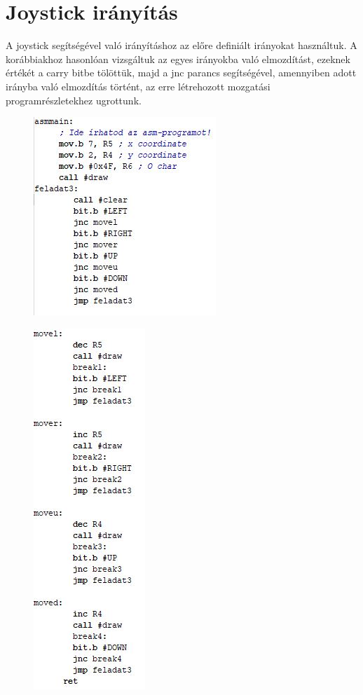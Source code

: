 \documentclass[10pt, conference, a4paper]{ITKproc}
\begin{document}
\section{Joystick irányítás}
A joystick segítségével való irányításhoz az előre definiált irányokat használtuk. A korábbiakhoz hasonlóan vizsgáltuk az egyes irányokba való elmozdítást, ezeknek értékét a carry bitbe tölöttük, majd a jnc parancs segítségével, amennyiben adott irányba való elmozdítás történt, az erre létrehozott mozgatási programrészletekhez ugrottunk. 

\begin{figure}[h]
\includegraphics[scale=0.65]{3main}
\centering
\end{figure}


\begin{figure}[h]
\includegraphics[scale=0.65]{3move}
\centering
\end{figure}
\end{document}
